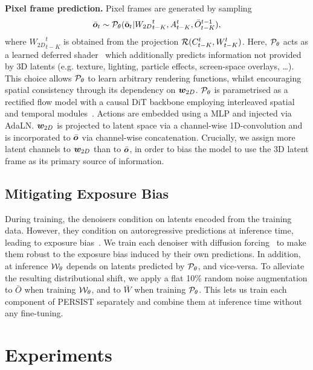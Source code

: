 \textbf{Pixel frame prediction.}
Pixel frames are generated by sampling
\begin{equation}
    \bar{{\bm{o}}}_t \sim {\mathcal{P}}_\theta (\bar{{\mathbf{o}}}_t | {W_{2D}}_{t-K}^{t}, A^t_{t-K}, \bar{O}^{t-1}_{t-K}),
\end{equation}
where ${W_{2D}}_{t-K}^{t}$ is obtained from the projection ${\mathcal{R}}(C_{t-K}^{t},W_{t-K}^{t})$. Here, ${\mathcal{P}}_\theta$ acts as a learned deferred shader~\cite{thies2019deferred} which additionally predicts information not provided by 3D latents (e.g. texture, lighting, particle effects, screen-space overlays, \ldots). This choice allows ${\mathcal{P}}_\theta$ to learn arbitrary rendering functions, whilst encouraging spatial consistency through its dependency on ${\bm{w}}_{2D}$. ${\mathcal{P}}_\theta$ is parametrised as a rectified flow model with a causal DiT backbone employing interleaved spatial and temporal modules~\citep{decart2024oasis}. Actions are embedded using a MLP and injected via AdaLN. ${\bm{w}}_{2D}$ is projected to latent space via a channel-wise 1D-convolution and is incorporated to $\bar{{\bm{o}}}$ via channel-wise concatenation. Crucially, we assign more latent channels to ${\bm{w}}_{2D}$ than to $\bar{{\bm{o}}}$, in order to bias the model to use the 3D latent frame as its primary source of information.

\vspace{-0.24cm}
\subsection{Mitigating Exposure Bias}

During training, the denoisers condition on latents encoded from the training data. However, they condition on autoregressive predictions at inference time, leading to exposure bias~\citep{ning2023elucidating}. We train each denoiser with diffusion forcing~\citep{chen2024diffusion} to make them robust to the exposure bias induced by their own predictions. In addition, at inference ${\mathcal{W}}_\theta$ depends on latents predicted by ${\mathcal{P}}_\theta$, and vice-versa. To alleviate the resulting distributional shift, we apply a flat 10\% random noise augmentation to $\bar{O}$ when training ${\mathcal{W}}_\theta$, and to $\bar{W}$ when training ${\mathcal{P}}_\theta$. This lets us train each component of PERSIST separately and combine them at inference time without any fine-tuning.

\vspace{-0.24cm}
\section{Experiments}


